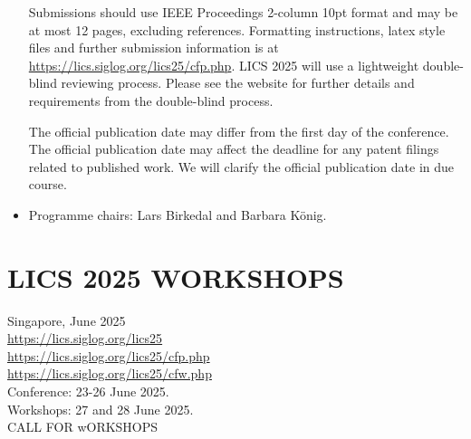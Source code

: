 \documentclass[prodmode,acmtecs]{acmsmall} %
\begin{document}
\begin{itemize}
  Submissions should use IEEE Proceedings 2-column 10pt format and may be at most 12 pages, excluding references. Formatting instructions, latex style files and further submission information is at \href{https://lics.siglog.org/lics25/cfp.php}{https://lics.siglog.org/lics25/cfp.php}. LICS 2025 will use a lightweight double-blind reviewing process. Please see the website for further details and requirements from the double-blind process. 
 
  The official publication date may differ from the first day of the conference. The official publication date may affect the deadline for any patent filings related to published work. We will clarify the official publication date in due course. 
 
\item  Programme chairs: Lars Birkedal and Barbara König. 
 
\end{itemize}\section{LICS 2025 WORKSHOPS  }\label{LICS2025WORKSHOPS}  Singapore, June 2025\\ 
  \href{https://lics.siglog.org/lics25}{https://lics.siglog.org/lics25}\\ 
  \href{https://lics.siglog.org/lics25/cfp.php}{https://lics.siglog.org/lics25/cfp.php}\\ 
  \href{https://lics.siglog.org/lics25/cfw.php}{https://lics.siglog.org/lics25/cfw.php}\\ 
  Conference: 23-26 June 2025.\\ 
  Workshops: 27 and 28 June 2025.\\ 
CALL FOR wORKSHOPS 
\end{document}
